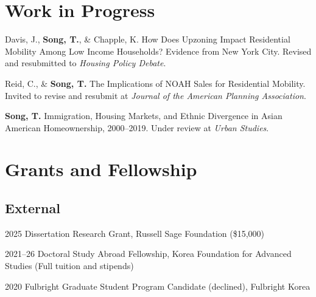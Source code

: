 \documentclass[11pt,letterpaper]{article}
\newcommand{\money}[1]{(\$#1)}
\newcommand{\term}[1]{(#1)}
\begin{document}
\section{Work in Progress}
\begin{subpoints}
\item Davis, J., \textbf{Song, T.}, \& Chapple, K. How Does Upzoning Impact Residential Mobility Among Low Income Households? Evidence from New York City. Revised and resubmitted to \emph{Housing Policy Debate}.
  \item Reid, C., \& \textbf{Song, T.} The Implications of NOAH Sales for Residential Mobility. Invited to revise and resubmit at \emph{Journal of the American Planning Association}.
  \item \textbf{Song, T.} Immigration, Housing Markets, and Ethnic Divergence in Asian American Homeownership, 2000–2019. Under review at \emph{Urban Studies}.
\end{subpoints}

\section{Grants and Fellowship}

\subsection{External}
\begin{tablist}
  \item[2025] \tab{}Dissertation Research Grant, Russell Sage Foundation \money{15,000}
  \item[2021–26] \tab{}Doctoral Study Abroad Fellowship, Korea Foundation for Advanced Studies \term{Full tuition and stipends}
  \item[2020] \tab{}Fulbright Graduate Student Program Candidate \term{declined}, Fulbright Korea
\end{tablist}
\end{document}
